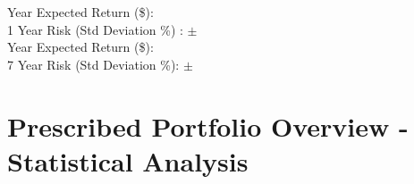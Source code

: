 \documentclass{article}
\begin{document}
 Year Expected Return (\$): {} \quad \emph{{}} \\
1 Year Risk (Std Deviation \%) : $\pm$ {}
\\
 Year Expected Return (\$): {} \quad \emph{{}} \\
7 Year Risk (Std Deviation \%): $\pm$ {}


\newpage    %


\section{Prescribed Portfolio Overview - Statistical Analysis}

\vspace{1.5cm}

\end{document}
